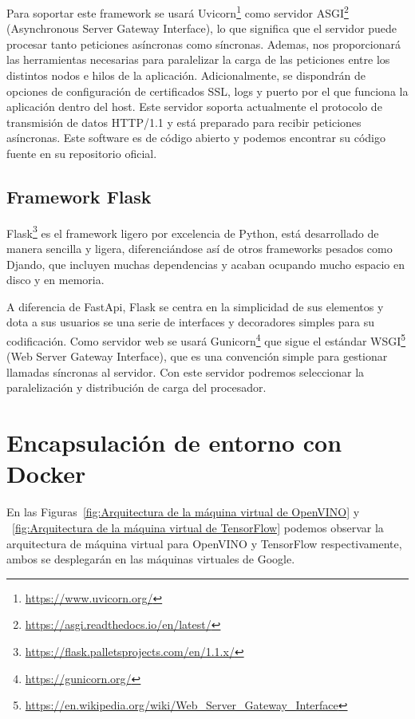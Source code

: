 Para soportar este framework se usará Uvicorn\footnote{\url{https://www.uvicorn.org/}} como servidor ASGI\footnote{\url{https://asgi.readthedocs.io/en/latest/}} (Asynchronous Server Gateway Interface), lo que significa que el servidor puede procesar tanto peticiones asíncronas como síncronas.
Ademas, nos proporcionará las herramientas necesarias para paralelizar la carga de las peticiones entre los distintos nodos e hilos de la aplicación.
Adicionalmente, se dispondrán de opciones de configuración de certificados SSL, logs y puerto por el que funciona la aplicación dentro del host.
Este servidor soporta actualmente el protocolo de transmisión de datos HTTP/1.1 y está preparado para recibir peticiones asíncronas.
Este software es de código abierto y podemos encontrar su código fuente en su repositorio oficial.

\subsection{Framework Flask}\label{subsec:framework-flask}
Flask\footnote{\url{https://flask.palletsprojects.com/en/1.1.x/}} es el framework ligero por excelencia de Python, está desarrollado de manera sencilla y ligera, diferenciándose así de otros frameworks pesados como Djando, que incluyen
muchas dependencias y acaban ocupando mucho espacio en disco y en memoria.

A diferencia de FastApi, Flask\cite{python_flask} se centra en la simplicidad de sus elementos y dota a sus usuarios se una serie de interfaces y decoradores simples para su codificación.
Como servidor web se usará Gunicorn\footnote{\url{https://gunicorn.org/}} que sigue el estándar WSGI\footnote{\url{https://en.wikipedia.org/wiki/Web\_Server\_Gateway\_Interface}} (Web Server Gateway Interface), que es una convención simple para gestionar llamadas síncronas al servidor.
Con este servidor podremos seleccionar la paralelización y distribución de carga del procesador.
\section{Encapsulación de entorno con Docker}\label{sec:encapsulación-de-entorno-con-docker}
En las Figuras~\ref{fig:Arquitectura de la máquina virtual de OpenVINO} y ~\ref{fig:Arquitectura de la máquina virtual de TensorFlow} podemos observar la arquitectura de máquina virtual para OpenVINO y TensorFlow respectivamente, ambos se desplegarán en las máquinas virtuales de Google.

